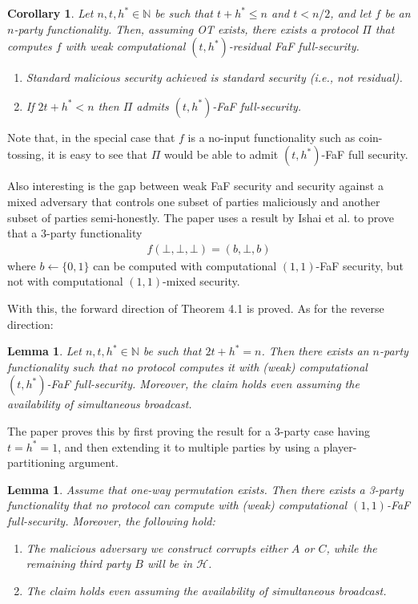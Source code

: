 \documentclass[11pt, a4paper]{article}
\newtheorem{lemma}[theorem]{Lemma}
\newtheorem{corollary}[theorem]{Corollary}
\theoremstyle{definition}
\theoremstyle{remark}
\begin{document}
\begin{corollary}
Let $n, t, h^*\in\mathbb{N}$ be such that $t+h^*\leq n$ and $t < n/2$, and let $f$ be an $n$-party
functionality. Then, assuming OT exists, there exists a protocol $\Pi$ that computes $f$ with weak
computational $(t, h^*)$-residual FaF full-security.
\begin{enumerate}
    \item Standard malicious security achieved is standard security (i.e., not residual).
    \item If $2t + h^* < n$ then $\Pi$ admits $(t, h^*)$-FaF full-security.
\end{enumerate}
\end{corollary}

Note that, in the special case that $f$ is a no-input functionality such as coin-tossing, it is easy to see that $\Pi$ would be able to admit $(t,h^*)$-FaF full security.

\medskip

Also interesting is the gap between weak FaF security and security against a mixed adversary that controls one subset of parties maliciously and another subset of parties semi-honestly. The paper uses a result by Ishai et al. to prove that a 3-party functionality
\begin{align*}
    f(\bot,\bot,\bot) = (b,\bot,b)
\end{align*}
where $b\leftarrow\{0,1\}$ can be computed with computational $(1,1)$-FaF security, but not with computational $(1,1)$-mixed security.

\medskip

With this, the forward direction of Theorem 4.1 is proved. As for the reverse direction:

\begin{lemma}
Let $n,t,h^*\in\mathbb{N}$ be such that $2t+h^* = n$. Then there exists an $n$-party functionality such that no protocol computes it with (weak) computational $(t, h^*)$-FaF full-security. Moreover, the claim holds even assuming the availability of simultaneous broadcast.
\end{lemma}

The paper proves this by first proving the result for a 3-party case having $t=h^*=1$, and then extending it to multiple parties by using a player-partitioning argument.

\begin{lemma}
Assume that one-way permutation exists. Then there exists a 3-party functionality that no protocol can compute with (weak) computational $(1, 1)$-FaF full-security. Moreover, the following hold:
\begin{enumerate}
    \item The malicious adversary we construct corrupts either $A$ or $C$, while the remaining third party $B$ will be in $\mathcal{H}$.
    \item The claim holds even assuming the availability of simultaneous broadcast.
\end{enumerate}
\end{lemma}
\end{document}
